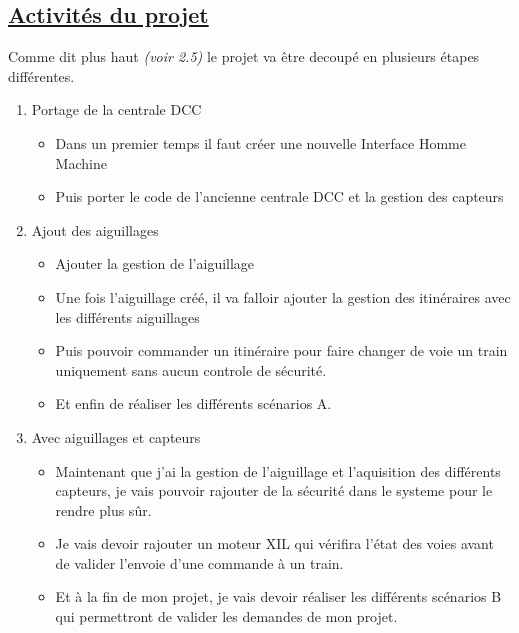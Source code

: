\subsection{\underline{Activit\'es du projet}}
\label{sec:activ}

Comme dit plus haut \emph{(voir 2.5)} le projet va \^etre decoup\'e en
plusieurs \'etapes diff\'erentes.

\begin{enumerate}[1]
  \item Portage de la centrale DCC
  \begin{itemize}
    \item Dans un premier temps il faut cr\'eer une nouvelle Interface
      Homme Machine
    \item Puis porter le code de l'ancienne centrale DCC et la
      gestion des capteurs
  \end{itemize}

  \item Ajout des aiguillages
  \begin{itemize}
    \item Ajouter la gestion de l'aiguillage
    \item Une fois l'aiguillage cr\'e\'e, il va falloir ajouter la
      gestion des itinéraires avec les différents aiguillages
    \item Puis pouvoir commander un itinéraire
      pour faire changer de voie un train uniquement
      sans aucun controle de s\'ecurit\'e.
    \item Et enfin de r\'ealiser les diff\'erents sc\'enarios A.
  \end{itemize}

  \item Avec aiguillages et capteurs
    \begin{itemize}
      \item Maintenant que j'ai la gestion de l'aiguillage et
        l'aquisition des différents capteurs, je vais pouvoir rajouter
        de la s\'ecurit\'e dans le systeme pour le rendre plus s\^ur.
      \item Je vais devoir rajouter un moteur XIL qui v\'erifira
        l'\'etat des voies avant de valider l'envoie d'une commande \`a
        un train.
      \item Et \`a la fin de mon projet, je vais devoir r\'ealiser les
        diff\'erents sc\'enarios B qui permettront de valider les
        demandes de mon projet.      
    \end{itemize}
\end{enumerate}

